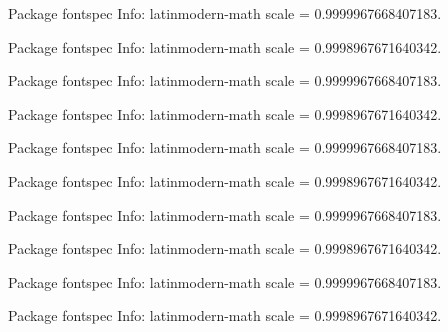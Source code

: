 \documentclass[
  letterpaper,
  DIV=11,
  numbers=noendperiod]{scrartcl}
\newenvironment{Shaded}{\begin{snugshade}}{\end{snugshade}}
\newcommand{\NormalTok}[1]{\textcolor[rgb]{0.00,0.23,0.31}{#1}}
\begin{document}
\begin{Shaded}
\begin{Highlighting}[]
\NormalTok{Package fontspec Info: latinmodern{-}math scale = 0.9999967668407183.}


\NormalTok{Package fontspec Info: latinmodern{-}math scale = 0.9998967671640342.}


\NormalTok{Package fontspec Info: latinmodern{-}math scale = 0.9999967668407183.}


\NormalTok{Package fontspec Info: latinmodern{-}math scale = 0.9998967671640342.}


\NormalTok{Package fontspec Info: latinmodern{-}math scale = 0.9999967668407183.}


\NormalTok{Package fontspec Info: latinmodern{-}math scale = 0.9998967671640342.}


\NormalTok{Package fontspec Info: latinmodern{-}math scale = 0.9999967668407183.}


\NormalTok{Package fontspec Info: latinmodern{-}math scale = 0.9998967671640342.}


\NormalTok{Package fontspec Info: latinmodern{-}math scale = 0.9999967668407183.}


\NormalTok{Package fontspec Info: latinmodern{-}math scale = 0.9998967671640342.}



\end{Highlighting}
\end{Shaded}
\end{document}
